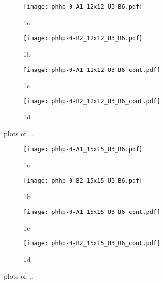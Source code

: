 \begin{figure}
  \begin{subfigure}{.5\textwidth}
    \centering
    \texttt{[image: phhp-0-A1\_12x12\_U3\_B6.pdf]}
    \caption{1a}
    \label{fig:sfig1}
  \end{subfigure}%
  \begin{subfigure}{.5\textwidth}
    \centering
    \texttt{[image: phhp-0-B2\_12x12\_U3\_B6.pdf]}
    \caption{1b}
    \label{fig:sfig2}
  \end{subfigure}
  \begin{subfigure}{.5\textwidth}
      \centering
      \texttt{[image: phhp-0-A1\_12x12\_U3\_B6\_cont.pdf]}
      \caption{1c}
      \label{fig:sfig3}
  \end{subfigure}
  \begin{subfigure}{.5\textwidth}
      \centering
      \texttt{[image: phhp-0-B2\_12x12\_U3\_B6\_cont.pdf]}
      \caption{1d}
      \label{fig:sfig4}
  \end{subfigure}
  \caption{plots of....}
  \label{fig:fig}
\end{figure}

\begin{figure}
  \begin{subfigure}{.5\textwidth}
    \centering
    \texttt{[image: phhp-0-A1\_15x15\_U3\_B6.pdf]}
    \caption{1a}
    \label{fig:sfig1}
  \end{subfigure}%
  \begin{subfigure}{.5\textwidth}
    \centering
    \texttt{[image: phhp-0-B2\_15x15\_U3\_B6.pdf]}
    \caption{1b}
    \label{fig:sfig2}
  \end{subfigure}
  \begin{subfigure}{.5\textwidth}
      \centering
      \texttt{[image: phhp-0-A1\_15x15\_U3\_B6\_cont.pdf]}
      \caption{1c}
      \label{fig:sfig3}
  \end{subfigure}
  \begin{subfigure}{.5\textwidth}
      \centering
      \texttt{[image: phhp-0-B2\_15x15\_U3\_B6\_cont.pdf]}
      \caption{1d}
      \label{fig:sfig4}
  \end{subfigure}
  \caption{plots of....}
  \label{fig:fig}
\end{figure}

